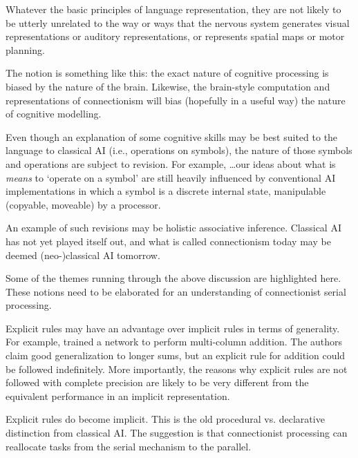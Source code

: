 \bssq
Whatever the basic principles of language representation, they
are not likely to be utterly unrelated to the way or ways that
the nervous system generates visual representations or auditory
representations, or represents spatial maps or motor planning.

\hfill \cite[page 42]{churneur}
\essq

The notion is something like this: the exact nature of cognitive
processing is biased by the nature of the brain.  Likewise, the
brain-style computation and representations of
connectionism will bias (hopefully in a
useful way) the nature of cognitive modelling.

Even though an explanation of some cognitive skills may be best suited
to the language to classical AI (i.e., operations on symbols), the
nature of those symbols and operations are subject to revision. For
example,
\bssq
\ldots our ideas about what is {\em means} to `operate on a symbol'
are still heavily influenced by conventional AI implementations in
which a symbol is a discrete internal state, manipulable (copyable,
moveable) by a processor.

\hfill \cite[page 12]{clarconn}
\essq

An example of such revisions may be holistic associative inference.
Classical AI has not yet played itself out, and what is called
connectionism today may be deemed (neo-)classical AI tomorrow.


Some of the themes running through the above discussion are
highlighted here. These notions need to be elaborated for an
understanding of connectionist serial processing.

 Explicit rules may have an
advantage over implicit rules in terms of generality.  For example,
 trained a network to perform multi-column addition.
The authors claim good generalization to longer sums, but an
explicit rule for addition could be followed indefinitely. More
importantly, the reasons why explicit rules are not followed with
complete precision are likely to be very different from the equivalent
performance in an implicit representation.

 Explicit rules do
become implicit.  This is the old procedural vs. declarative
distinction from classical AI.  The suggestion is that connectionist
processing can reallocate tasks from the serial mechanism to the
parallel.

